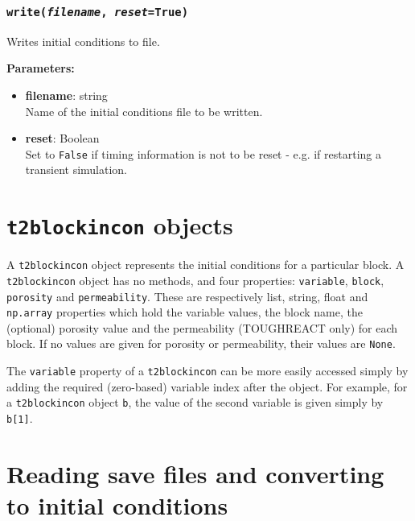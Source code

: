 \begin{snugshade}
\subsubsection{\texttt{write(\emph{filename}, \emph{reset}=True)}}
\end{snugshade}
\label{sec:t2incon:write}

Writes initial conditions to file.

\textbf{Parameters:}
\begin{itemize}
\item \textbf{filename}: string\\
  Name of the initial conditions file to be written.
\item \textbf{reset}: Boolean\\
  Set to \texttt{False} if timing information is not to be reset - e.g. if restarting a transient simulation.
\end{itemize}

\section{\texttt{t2blockincon} objects}
\label{t2blockincons}

A \texttt{t2blockincon} object represents the initial conditions for a particular block.  A \texttt{t2blockincon} object has no methods, and four properties: \texttt{variable}, \texttt{block}, \texttt{porosity} and \texttt{permeability}.  These are respectively list, string, float and \texttt{np.array} properties which hold the variable values, the block name, the (optional) porosity value and the permeability (TOUGHREACT only) for each block.  If no values are given for porosity or permeability, their values are \texttt{None}.

The \texttt{variable} property of a \texttt{t2blockincon} can be more easily accessed simply by adding the required (zero-based) variable index after the object.  For example, for a \texttt{t2blockincon} object \texttt{b}, the value of the second variable is given simply by \texttt{b[1]}.

\section{Reading save files and converting to initial conditions}

